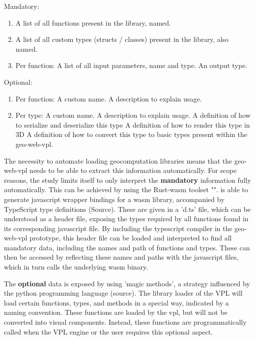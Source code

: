 Mandatory: 
\begin{enumerate}[-]
  \item A list of all functions present in the library, named.
  \item A list of all custom types (structs / classes) present in the library, also named.
  \item Per function:  
  \subitem A list of all input parameters, name and type.
  \subitem An output type.
\end{enumerate}

Optional: 
\begin{enumerate}[-]
  \item Per function:
  \subitem A custom name.
  \subitem A description to explain usage.

  \item Per type:
  \subitem A custom name.
  \subitem A description to explain usage.
  \subitem A definition of how to serialize and deserialize this type  
  \subitem A definition of how to render this type in 3D
  \subitem A definition of how to convert this type to basic types present within the geo-web-vpl.  
\end{enumerate}

The necessity to automate loading geocomputation libraries means that the \ac{geo-web-vpl} needs to be able to extract this information automatically. 
For scope reasons, the study limits itself to only interpret the \textbf{mandatory} information fully automatically. 
This can be achieved by using the Rust-wasm toolset "". 
 is able to generate javascript wrapper bindings for a \ac{wasm} library, accompanied by TypeScript type definitions (Source). 
These are given in a 'd.ts' file, which can be understood as a header file, exposing the types required by all functions found in its corresponding javascript file. 
By including the typescript compiler in the \ac{geo-web-vpl} prototype, this header file can be loaded and interpreted to find all mandatory data, including the names and path of functions and types. 
These can then be accessed by reflecting these names and paths with the javascript files, which in turn calls the underlying \ac{wasm} binary.

The \textbf{optional} data is exposed by using 'magic methods', a strategy influenced by the python programming language (source). 
The library loader of the VPL will load certain functions, types, and methods in a special way, indicated by a naming convention. 
These functions are loaded by the vpl, but will not be converted into visual components. 
Instead, these functions are programmatically called when the VPL engine or the user requires this optional aspect. 


